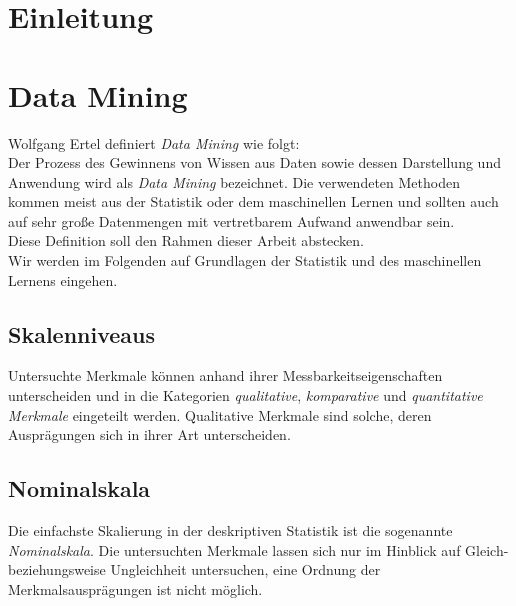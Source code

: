\documentclass[a4paper]{scrartcl}
\author{Janek Boll}
\author{Steven Minich}
\date{\today}
\newcommand{\blankpage}{
\newpage
\thispagestyle{empty}
\mbox{}
\newpage
}
\begin{document}
    

    \blankpage

    
    \newpage
    

    \blankpage
    
    \vspace*{\fill}
    \begin{abstract}
        \lipsum[1]
    \end{abstract}
    \vspace*{\fill}
    
    \newpage
    
    \tableofcontents
    
    \newpage

    \begin{multicols}{2}
        \section{Einleitung}
        \section{Data Mining}
            Wolfgang Ertel definiert \emph{Data Mining} wie folgt:\\
            Der Prozess des Gewinnens von Wissen aus Daten sowie dessen Darstellung und Anwendung wird als \emph{Data Mining} bezeichnet. Die verwendeten Methoden kommen meist aus der Statistik oder dem maschinellen Lernen und sollten auch auf sehr große Datenmengen mit vertretbarem Aufwand anwendbar sein.\\
            
            Diese Definition soll den Rahmen dieser Arbeit abstecken.\\
            Wir werden im Folgenden auf Grundlagen der Statistik und des maschinellen Lernens eingehen.
            \subsection{Skalenniveaus}
                Untersuchte Merkmale können anhand ihrer Messbarkeitseigenschaften unterscheiden und in die Kategorien \emph{qualitative}, \emph{komparative} und \emph{quantitative Merkmale} eingeteilt werden.
                Qualitative Merkmale sind solche, deren Ausprägungen sich in ihrer Art unterscheiden. 
                \cite{kohn2005}
            \subsection{Nominalskala}
                Die einfachste Skalierung in der deskriptiven Statistik ist die sogenannte \emph{Nominalskala}. Die untersuchten Merkmale lassen sich nur im Hinblick auf Gleich- beziehungsweise Ungleichheit untersuchen, eine Ordnung der Merkmalsausprägungen ist nicht möglich. 
                \cite{kohn2005}

\end{multicols}
\end{document}
